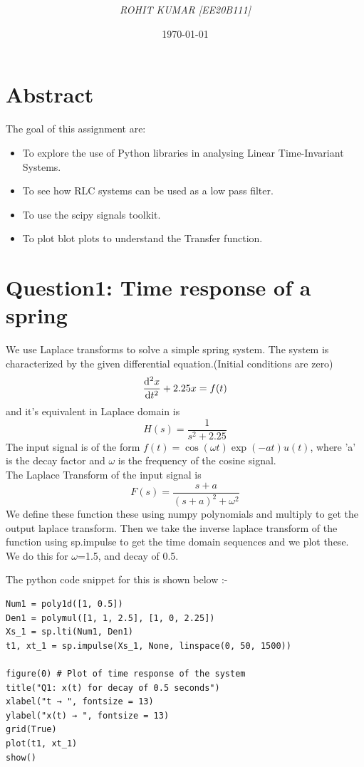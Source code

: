 \documentclass[11pt, a4paper]{article}
\title{\underline{\textbf{\textlt{\Large{Assignment 6: The Laplace Transform}}}}}
\author{\textsl{ROHIT KUMAR [EE20B111]}}
\date{\today}
\begin{document}
	
\lstset{language=Python}
	
\maketitle %
  \section*{Abstract}
  The goal of this assignment are:
  \begin{itemize}
  \item
    To  explore  the  use  of  Python  libraries  in analysing Linear Time-Invariant Systems.
  \item
  	To see how RLC systems can be used as a low pass filter.
  \item
	To use the scipy signals toolkit.
  \item
	To plot blot plots to understand the Transfer function.	
\end{itemize}  	
  
  \section{Question1: Time response of a spring}
    We use Laplace transforms to solve a simple spring system.
The system is characterized by the given differential equation.(Initial conditions are zero)
\[\dv[2]{x}{t} + 2.25x = f(t) \]
and it's equivalent in Laplace domain is
\[H(s) =  \frac{1}{s^2+2.25}\]
The input signal is of the form 
\(f(t) = \cos{(\omega t)}\exp(-at)u(t)\),
where 'a' is the decay factor and $\omega$ is the frequency of the cosine signal.\\
The Laplace Transform of the input signal is
\[ F(s) = \frac{s+a}{(s+a)^2+\omega^2 }\]
We define these function these using numpy polynomials and multiply to get the output laplace transform.
Then we take the inverse laplace transform of the function using sp.impulse to get the time domain sequences and we plot these.
We do this for $\omega$=1.5, and decay of 0.5.

The python code snippet for this is shown below :-

\begin{verbatim}
Num1 = poly1d([1, 0.5])                    
Den1 = polymul([1, 1, 2.5], [1, 0, 2.25]) 
Xs_1 = sp.lti(Num1, Den1)
t1, xt_1 = sp.impulse(Xs_1, None, linspace(0, 50, 1500)) 

figure(0) # Plot of time response of the system
title("Q1: x(t) for decay of 0.5 seconds") 
xlabel("t → ", fontsize = 13)
ylabel("x(t) → ", fontsize = 13)
grid(True) 
plot(t1, xt_1)
show()

\end{verbatim}
\end{document}
